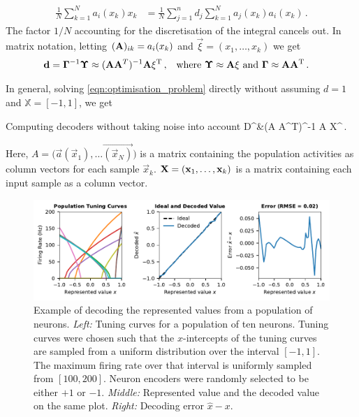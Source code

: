 \documentclass[10pt,letterpaper,oneside]{article}
\begin{document}
\begin{align*}
	\frac{1}N \sum_{k = 1}^N a_i(x_k) x_k
		&= \frac{1}N \sum_{j = 1}^n d_j \sum_{k = 1}^N a_j(x_k) a_i(x_k) \,.
\end{align*}
The factor $1/N$ accounting for the discretisation of the integral cancels out. In matrix notation, letting $({\mathbf{A}})_{ik} = a_i(x_k)$ and $\vec \xi = (x_1, \ldots, x_k)$ we get
\begin{align*}
	{\mathbf{d}} &={\mathbf{\Gamma}}^{-1} {\mathbf{\Upsilon}} \approx  ({\mathbf{A}} {\mathbf{A}}^T)^{-1} {\mathbf{A}} {\mathbf{\xi}}^{\mathrm{T}} \,, &&
	\text{where } {\mathbf{\Upsilon}} \approx {\mathbf{A}} {\mathbf{\xi}} \text{ and } {\mathbf{\Gamma}} \approx {\mathbf{A}} {\mathbf{A}}^{\mathrm{T}} \,.
\end{align*}

In general, solving \cref{eqn:optimisation_problem} directly without assuming $d = 1$ and $\mathbb{X} = [-1, 1]$, we get
\begin{ImportantEqn}{Computing decoders without taking noise into account}
	\mat D^\T &\approx  (\mat A \mat A^T)^{-1} \mat A \mat X^\T \,.
	\label{eqn:decoders}
\end{ImportantEqn}
Here, $A = \big(\vec a(\vec x_1), \ldots \vec{(\vec x_N)}\big)$ is a matrix containing the population activities as column vectors for each sample ${\vec x}_k$. ${\mathbf{X}} = ({{\mathbf{x}}}_1, \ldots, {{\mathbf{x}}}_k)$ is a matrix containing each input sample as a column vector.

\begin{figure}
	\centering
	\includegraphics{media/decoding_example_no_noise.pdf}
	\caption{Example of decoding the represented values from a population of neurons. \emph{Left:} Tuning curves for a population of ten neurons. Tuning curves were chosen such that the $x$-intercepts of the tuning curves are sampled from a uniform distribution over the interval $[-1, 1]$. The maximum firing rate over that interval is uniformly sampled from $[100, 200]$. Neuron encoders were randomly selected to be either $+1$ or $-1$. \emph{Middle:} Represented value and the decoded value on the same plot. \emph{Right:} Decoding error $\hat x - x$. }
	\label{fig:decoding_example_no_noise}
\end{figure}
\end{document}
